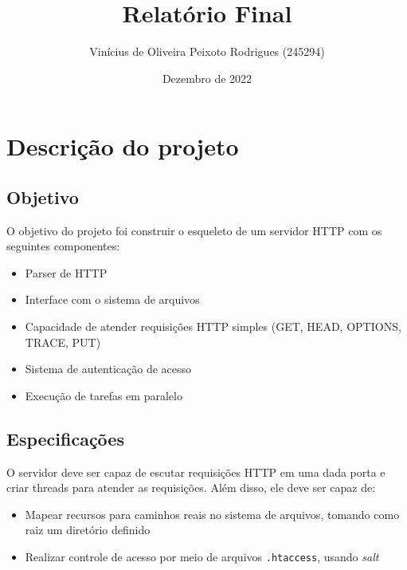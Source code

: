 \documentclass{article}
\title{Relatório Final}
\author{Vinícius de Oliveira Peixoto Rodrigues (245294)}
\date{Dezembro de 2022}
\begin{document}
\maketitle

\section*{Descrição do projeto}

\subsection*{Objetivo}
O objetivo do projeto foi construir o esqueleto de um servidor HTTP com os seguintes componentes:

\begin{itemize}
    \item Parser de HTTP
    \item Interface com o sistema de arquivos
    \item Capacidade de atender requisições HTTP simples (GET, HEAD, OPTIONS, TRACE, PUT)
    \item Sistema de autenticação de acesso
    \item Execução de tarefas em paralelo
\end{itemize}

\subsection*{Especificações}

O servidor deve ser capaz de escutar requisições HTTP em uma dada porta e criar threads para atender as requisições. Além disso, ele deve ser capaz de:

\begin{itemize}
    \item Mapear recursos para caminhos reais no sistema de arquivos, tomando como raiz um diretório definido
    \item Realizar controle de acesso por meio de arquivos \texttt{.htaccess}, usando \textit{salt}
\end{itemize}
\end{document}
